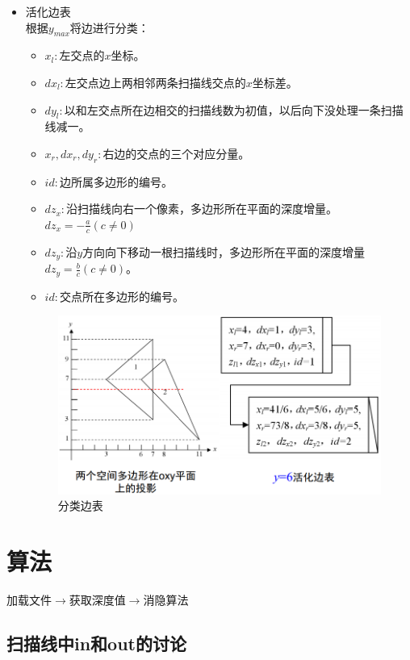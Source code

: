 \documentclass[10pt]{article}
\begin{document}
\begin{itemize}
\item{活化边表}\\
根据$y_{max}$将边进行分类：
\begin{itemize}
\item{$x_l:$左交点的$x$坐标。}
\item{$dx_l:$左交点边上两相邻两条扫描线交点的$x$坐标差。}
\item{$dy_l:$以和左交点所在边相交的扫描线数为初值，以后向下没处理一条扫描线减一。}
\item{$x_r,dx_r,dy_r:$右边的交点的三个对应分量。}
\item{$id:$边所属多边形的编号。}
\item{$dz_x:$沿扫描线向右一个像素，多边形所在平面的深度增量。$dz_x=-\frac{a}{c}(c \neq 0)$}
\item{$dz_y:$沿$y$方向向下移动一根扫描线时，多边形所在平面的深度增量$dz_y=\frac{b}{c}(c \neq 0)$。}
\item{$id:$交点所在多边形的编号。}
\end{itemize}
\begin{figure}[H]
\begin{center}
\includegraphics[scale=0.4]{structure2.png}
\end{center}
\caption{分类边表}
\end{figure}
\end{itemize}

\section{算法}
加载文件$\to$获取深度值$\to$消隐算法
\subsection{扫描线中in和out的讨论}
\end{document}
